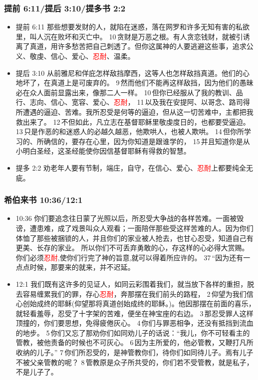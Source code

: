 \subsubsection{提前 6:11/提后 3:10/提多书 2:2} 
\begin{itemize}[noitemsep]
\item 提前 6:11 那些想要发财的人，就陷在迷惑，落在网罗和许多无知有害的私欲里，叫人沉在败坏和灭亡中。 10 贪财是万恶之根。有人贪恋钱财，就被引诱离了真道，用许多愁苦把自己刺透了。但你这属神的人要逃避这些事，追求公义、敬虔、信心、爱心、\textcolor{red}{忍耐}、温柔。 
\item 提后 3:10 从前雅尼和佯庇怎样敌挡摩西，这等人也怎样敌挡真道。他们的心地坏了，在真道上是可废弃的。 9 然而他们不能再这样敌挡，因为他们的愚昧必在众人面前显露出来，像那二人一样。 10 但你已经服从了我的教训、品行、志向、信心、宽容、爱心、\textcolor{red}{忍耐}， 11 以及我在安提阿、以哥念、路司得所遭遇的逼迫、苦难。我所忍受是何等的逼迫，但从这一切苦难中，主都把我救出来了。 12 不但如此，凡立志在基督耶稣里敬虔度日的，也都要受逼迫。 13 只是作恶的和迷惑人的必越久越恶，他欺哄人，也被人欺哄。 14 但你所学习的、所确信的，要存在心里，因为你知道是跟谁学的， 15 并且知道你是从小明白圣经，这圣经能使你因信基督耶稣有得救的智慧。
\item 提多 2:2 劝老年人要有节制，端庄，自守，在信心、爱心、\textcolor{red}{忍耐}上都要纯全无疵。
\end{itemize}

\subsubsection{希伯来书 10:36/12:1} 
\begin{itemize}[noitemsep]
\item 10:36 你们要追念往日蒙了光照以后，所忍受大争战的各样苦难。一面被毁谤，遭患难，成了戏景叫众人观看；一面陪伴那些受这样苦难的人。因为你们体恤了那些被捆锁的人，并且你们的家业被人抢去，也甘心忍受，知道自己有更美、长存的家业。 所以你们不可丢弃勇敢的心，存这样的心必得大赏赐。你们必须\textcolor{red}{忍耐},使你们行完了神的旨意,就可以得着所应许的。 37 “因为还有一点点时候，那要来的就来，并不迟延。

\item 12:1 我们既有这许多的见证人，如同云彩围着我们，就当放下各样的重担，脱去容易缠累我们的罪，存心\textcolor{red}{忍耐}，奔那摆在我们前头的路程， 2 仰望为我们信心创始成终的耶稣(仰望那将真道创始成终的耶稣。)。他因那摆在前面的喜乐，就轻看羞辱，忍受了十字架的苦难，便坐在神宝座的右边。 3 那忍受罪人这样顶撞的，你们要思想，免得疲倦灰心。 4 你们与罪恶相争，还没有抵挡到流血的地步。 5 你们又忘了那劝你们如同劝儿子的话说：“我儿，你不可轻看主的管教，被他责备的时候也不可灰心。 6 因为主所爱的，他必管教，又鞭打凡所收纳的儿子。” 7 你们所忍受的，是神管教你们，待你们如同待儿子。焉有儿子不被父亲管教的呢？ 8 管教原是众子所共受的，你们若不受管教，就是私子，不是儿子了。
\end{itemize}

